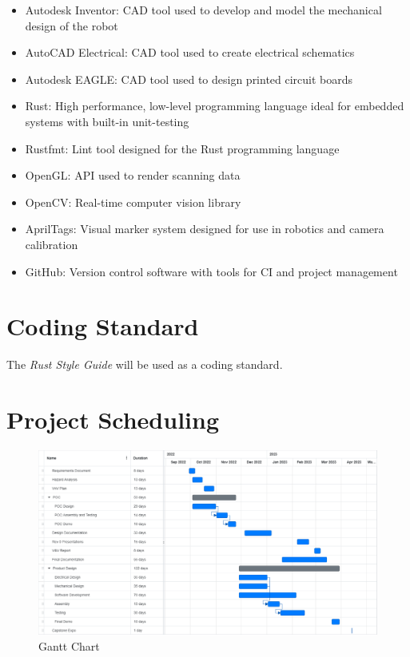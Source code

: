 \documentclass[titlepage]{article}
\begin{document}
\begin{itemize}
\item Autodesk Inventor: CAD tool used to develop and model the mechanical design of the robot
\item AutoCAD Electrical: CAD tool used to create electrical schematics
\item Autodesk EAGLE: CAD tool used to design printed circuit boards
\item Rust: High performance, low-level programming language ideal for embedded systems with built-in unit-testing
\item Rustfmt: Lint tool designed for the Rust programming language
\item OpenGL: API used to render scanning data
\item OpenCV: Real-time computer vision library 
\item AprilTags: Visual marker system designed for use in robotics and camera calibration
\item GitHub: Version control software with tools for CI and project management

\end{itemize}

\section{Coding Standard}

The \textit{Rust Style Guide} will be used as a coding standard.

\section{Project Scheduling}

\begin{figure} [H]
\begin{center}
	\includegraphics [width=1\textwidth] {Figures/Gantt.pdf}
	\caption{Gantt Chart}
	\label{fig:Gantt}
	\end{center}
\end{figure}
\end{document}
